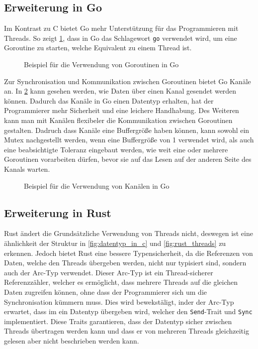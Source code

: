 \subsection{Erweiterung in Go}
\label{subsec:Erweiterung in Go}
Im Kontrast zu C bietet Go mehr Unterstützung für das Programmieren mit Threads.
So zeigt \cref{fig:goroutinen}, dass in Go das Schlagewort \texttt{go} verwendet 
wird, um eine Goroutine zu starten, welche Equivalent zu einem Thread ist.

\begin{figure}[htp]
    \centering
    
    \caption{Beispiel für die Verwendung von Goroutinen in Go}
    \label{fig:goroutinen}
\end{figure}

Zur Synchronisation und Kommunikation zwischen Goroutinen bietet Go
Kanäle an. In \cref{fig:go_kanäle} kann gesehen werden, wie Daten über einen 
Kanal gesendet werden können. Dadurch das Kanäle in Go einen Datentyp erhalten,
hat der Programmierer mehr Sicherheit und eine leichere Handhabung. Des Weiteren
kann man mit Kanälen flexibeler die Kommunikation zwischen Goroutinen gestalten.
Dadruch dass Kanäle eine Buffergröße haben können, kann sowohl ein Mutex 
nachgestellt werden, wenn eine Buffergröße von 1 verwendet wird, als auch eine 
beabsichtigte Toleranz eingebaut werden, wie weit eine oder mehrere Goroutinen 
vorarbeiten dürfen, bevor sie auf das Lesen auf der anderen Seite des Kanals 
warten. \autocite{hawthorneLanguageComparisonParallel}

\begin{figure}[htp]
    \centering
    
    \caption{Beispiel für die Verwendung von Kanälen in Go}
    \label{fig:go_kanäle}
\end{figure}

\subsection{Erweiterung in Rust}
\label{subsec:Erweiterung in Rust}

Rust ändert die Grundsätzliche Verwendung von Threads nicht, deswegen ist eine 
ähnlichkeit der Struktur in \cref{fig:datentyp_in_c} und \cref{fig:rust_threads}
zu erkennen. Jedoch bietet Rust eine bessere Typensicherheit, da die Referenzen
von Daten, welche den Threads übergeben werden, nicht nur typisiert sind, sondern
auch der Arc-Typ verwendet. Dieser Arc-Typ ist ein Thread-sicherer 
Referenzzähler, welcher es ermöglicht, dass mehrere Threads auf die gleichen Daten
zugreifen können, ohne dass der Programmierer sich um die Synchronisation kümmern
muss. Dies wird bewekstäligt, inder der Arc-Typ erwartet, dass im ein Datentyp 
übergeben wird, welcher den \texttt{Send}-Trait und \texttt{Sync} implementiert. 
Diese Traits garantieren, dass der Datentyp sicher zwischen Threads 
übertragen werden kann und dass er von mehreren Threads gleichzeitig gelesen aber
nicht beschrieben werden kann.
\autocite{pfosiComparisonConcurrencyRust,IntroductionRustExample}

